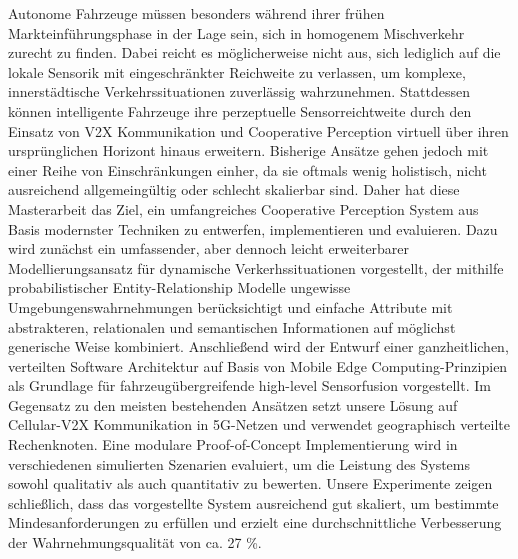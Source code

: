 Autonome Fahrzeuge müssen besonders während ihrer frühen Markteinführungsphase in der Lage sein, sich in homogenem Mischverkehr zurecht zu finden. Dabei reicht es möglicherweise nicht aus, sich lediglich auf die lokale Sensorik mit eingeschränkter Reichweite zu verlassen, um komplexe, innerstädtische Verkehrssituationen zuverlässig wahrzunehmen. Stattdessen können intelligente Fahrzeuge ihre perzeptuelle Sensorreichtweite durch den Einsatz von V2X Kommunikation und Cooperative Perception virtuell über ihren ursprünglichen Horizont hinaus erweitern. Bisherige Ansätze gehen jedoch mit einer Reihe von Einschränkungen einher, da sie oftmals wenig holistisch, nicht ausreichend allgemeingültig oder schlecht skalierbar sind. Daher hat diese Masterarbeit das Ziel, ein umfangreiches Cooperative Perception System aus Basis modernster Techniken zu entwerfen, implementieren und evaluieren. Dazu wird zunächst ein umfassender, aber dennoch leicht erweiterbarer Modellierungsansatz für dynamische Verkerhssituationen vorgestellt, der mithilfe probabilistischer Entity-Relationship Modelle ungewisse Umgebungenswahrnehmungen berücksichtigt und einfache Attribute mit abstrakteren, relationalen und semantischen Informationen auf möglichst generische Weise kombiniert. Anschließend wird der Entwurf einer ganzheitlichen, verteilten Software Architektur auf Basis von Mobile Edge Computing-Prinzipien als Grundlage für fahrzeugübergreifende high-level Sensorfusion vorgestellt. Im Gegensatz zu den meisten bestehenden Ansätzen setzt unsere Lösung auf Cellular-V2X Kommunikation in 5G-Netzen und verwendet geographisch verteilte Rechenknoten. Eine modulare Proof-of-Concept Implementierung wird in verschiedenen simulierten Szenarien evaluiert, um die Leistung des Systems sowohl qualitativ als auch quantitativ zu bewerten. Unsere Experimente zeigen schließlich, dass das vorgestellte System ausreichend gut skaliert, um bestimmte Mindesanforderungen zu erfüllen und erzielt eine durchschnittliche Verbesserung der Wahrnehmungsqualität von ca. 27 \%. 